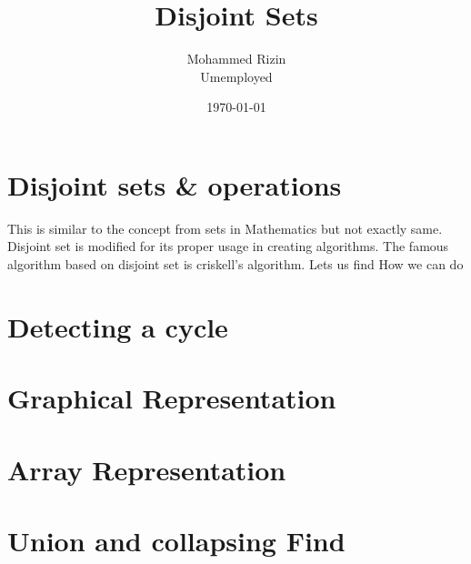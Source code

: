 \documentclass{article}
\title{Disjoint Sets}
\author{Mohammed Rizin \\ Umemployed}
\date{\today}
\begin{document}
\maketitle
\printindex

\section{Disjoint sets \& operations} 
This is similar to the concept from sets in Mathematics but not exactly same. Disjoint set is modified for its proper usage in creating algorithms. The famous algorithm based on disjoint set is criskell's algorithm.
Lets us find How we can do 

\section{Detecting a cycle} 

\section{Graphical Representation} 

\section{Array Representation} 

\section{Union and collapsing Find} 
\end{document}

